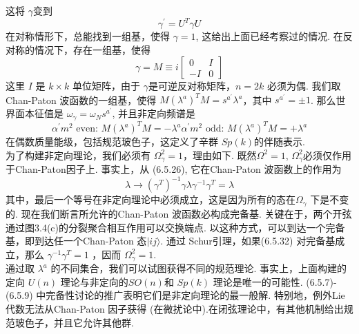 这将 $\gamma$变到
\begin{equation}
	\gamma^{\prime}=U^{T} \gamma U
\end{equation}
在对称情形下，总能找到一组基，使得 $\gamma=1$, 这给出上面已经考察过的情况. 在反对称的情况下，存在一组基，使得
\begin{equation}
	\gamma=M \equiv i\left[\begin{array}{cc}
		0 & I \\
		-I & 0
	\end{array}\right]
\end{equation}
这里 $I$ 是 $k \times k$ 单位矩阵，由于  $\gamma$是可逆反对称矩阵，$n=2 k$ 必须为偶. 我们取Chan-Paton 波函数的一组基，使得 $M\left(\lambda^{a}\right)^{T} M=s^{a^{\prime}} \lambda^{a}$，其中 $s^{a^{\prime}}=\pm 1$. 那么世界面本征值是 $\omega_{\gamma}=\omega_{N} s^{a^{\prime}}$, 并且非定向频谱是
\begin{subequations}
\begin{equation}
\alpha^{\prime} m^{2} \text { even: }  M\left(\lambda^{a}\right)^{T} M=-\lambda^{a}
\end{equation}
\begin{equation}
\alpha^{\prime} m^{2} \text { odd: }  M\left(\lambda^{a}\right)^{T} M=+\lambda^{a}
\end{equation}
\end{subequations}
在偶数质量能级，包括规范玻色子，这定义了辛群 $S p(k)$的伴随表示.\\
为了构建非定向理论，我们必须有 $\Omega_{\gamma}^{2}=1$，理由如下. 既然$\Omega^{2}=1$,  $\Omega_{\gamma}^{2}$必须仅作用于Chan-Paton因子上. 事实上，从 (6.5.26), 它在Chan-Paton 波函数上的作用为
\begin{equation}
	\lambda \rightarrow\left(\gamma^{T}\right)^{-1} \gamma \lambda \gamma^{-1} \gamma^{T}=\lambda
\end{equation}
其中，最后一个等号在非定向理论中必须成立，这是因为所有的态在$\Omega_{\gamma}$ 下是不变的. 现在我们断言所允许的Chan-Paton 波函数必构成完备基. 关键在于，两个开弦通过图3.4(c)的分裂聚合相互作用可以交换端点. 以这种方式，可以到达一个完备基，即到达任一个Chan-Paton 态$|i j\rangle$. 通过 Schur引理，如果(6.5.32) 对完备基成立，那么 $\gamma^{-1} \gamma^{T}=1$ ，因而 $\Omega_{\gamma}^{2}=1$.\\
通过取 $\lambda^{a} $ 的不同集合，我们可以试图获得不同的规范理论. 事实上，上面构建的定向 $U(n)$ 理论与非定向的$S O(n)$和 $S p(k)$ 理论是唯一的可能性. (6.5.7)-(6.5.9) 中完备性讨论的推广表明它们是非定向理论的最一般解. 特别地，例外Lie代数无法从Chan-Paton 因子获得 (在微扰论中).在闭弦理论中，有其他机制给出规范玻色子，并且它允许其他群.

